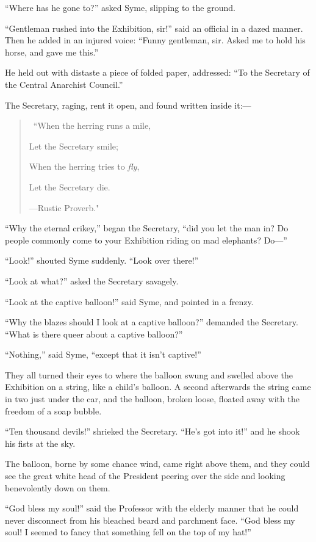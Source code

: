 \documentclass{book}
\begin{document}
“Where has he gone to?” asked Syme, slipping to the ground.

“Gentleman rushed into the Exhibition, sir!” said an official in a dazed manner. Then he added in an injured voice: “Funny gentleman, sir. Asked me to hold his horse, and gave me this.”

He held out with distaste a piece of folded paper, addressed: “To the Secretary of the Central Anarchist Council.”

The Secretary, raging, rent it open, and found written inside it:—

\begin{quotation}\
	“When the herring runs a mile,

	Let the Secretary smile;

	When the herring tries to \emph{fly},

	Let the Secretary die.

	—Rustic Proverb."
\end{quotation}

“Why the eternal crikey,” began the Secretary, “did you let the man in? Do people commonly come to your Exhibition riding on mad elephants? Do—”

“Look!” shouted Syme suddenly. “Look over there!”

“Look at what?” asked the Secretary savagely.

“Look at the captive balloon!” said Syme, and pointed in a frenzy.

“Why the blazes should I look at a captive balloon?” demanded the Secretary. “What is there queer about a captive balloon?”

“Nothing,” said Syme, “except that it isn’t captive!”

They all turned their eyes to where the balloon swung and swelled above the Exhibition on a string, like a child’s balloon. A second afterwards the string came in two just under the car, and the balloon, broken loose, floated away with the freedom of a soap bubble.

“Ten thousand devils!” shrieked the Secretary. “He’s got into it!” and he shook his fists at the sky.

The balloon, borne by some chance wind, came right above them, and they could see the great white head of the President peering over the side and looking benevolently down on them.

“God bless my soul!” said the Professor with the elderly manner that he could never disconnect from his bleached beard and parchment face. “God bless my soul! I seemed to fancy that something fell on the top of my hat!”
\end{document}
